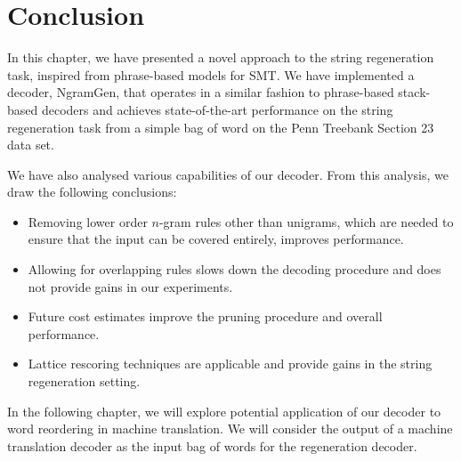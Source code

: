 \section{Conclusion}

In this chapter, we have presented a novel approach to the string regeneration
task, inspired from phrase-based models for SMT.
We have implemented a decoder, NgramGen, that operates in a similar fashion to phrase-based
stack-based decoders and achieves state-of-the-art
performance on the string regeneration task from a simple bag of word on the Penn Treebank
Section 23 data set.

We have also analysed various capabilities of our decoder.
From this analysis, we draw the following conclusions:
%
\begin{itemize}
  \item Removing lower order $n$-gram rules other than unigrams, which are needed to ensure that the input can be covered entirely, improves performance.
  \item Allowing for overlapping rules slows down the decoding procedure and
    does not provide gains in our experiments.
  \item Future cost estimates improve the pruning procedure and overall performance.
  \item Lattice rescoring techniques are applicable and provide gains in the string
    regeneration setting.
\end{itemize}


In the following chapter, we will explore potential application of our decoder
to word reordering in machine translation. We will consider the output of
a machine translation decoder as the input bag of words for the regeneration decoder.


%

